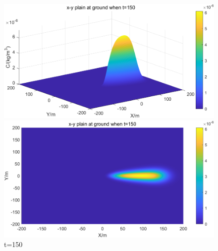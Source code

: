 \documentclass{article}
\begin{document}
	
	\begin{figure}[htbp]
		\begin{minipage}{0.49\textwidth}
			\includegraphics[width=\textwidth]{pics/default,t=150,3D.png}
		\end{minipage}
		\begin{minipage}{0.49\textwidth}
			\includegraphics[width=\textwidth]{pics/default,t=150,2D.png}
		\end{minipage}
		\caption{t=150}
		\label{fig3}
	\end{figure}
\end{document}
